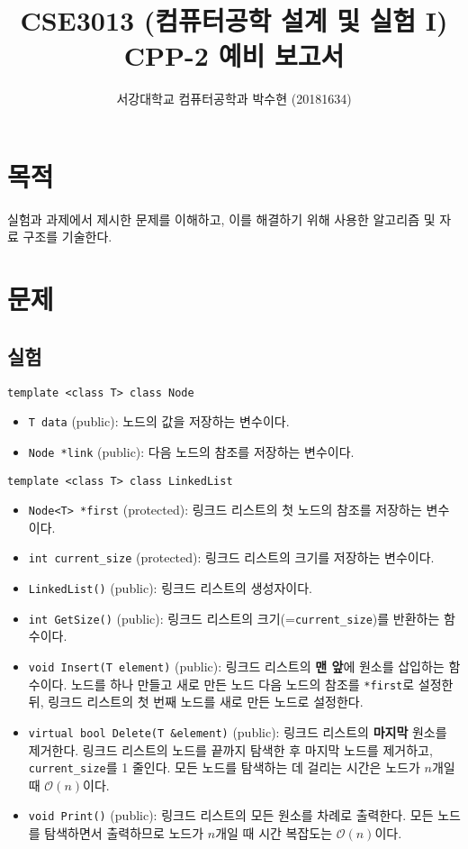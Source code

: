 
	


\title{CSE3013 (컴퓨터공학 설계 및 실험 I) \space \newline CPP-2 예비 보고서}
\author{서강대학교 컴퓨터공학과 박수현 (20181634)}
\maketitle

\section{목적}
실험과 과제에서 제시한 문제를 이해하고, 이를 해결하기 위해 사용한 알고리즘 및 자료 구조를 기술한다.

\section{문제}

\subsection{실험}

\texttt{template <class T> class Node}
\begin{itemize}
	\item \texttt{T data} (public): 노드의 값을 저장하는 변수이다.
	\item \texttt{Node *link} (public): 다음 노드의 참조를 저장하는 변수이다.
\end{itemize}

\texttt{template <class T> class LinkedList}
\begin{itemize}
	\item \texttt{Node<T> *first} (protected): 링크드 리스트의 첫 노드의 참조를 저장하는 변수이다.
	\item \texttt{int current_size} (protected): 링크드 리스트의 크기를 저장하는 변수이다.
	\item \texttt{LinkedList()} (public): 링크드 리스트의 생성자이다.
	\item \texttt{int GetSize()} (public): 링크드 리스트의 크기(=\texttt{current_size})를 반환하는 함수이다.
	\item \texttt{void Insert(T element)} (public): 링크드 리스트의 \textbf{맨 앞}에 원소를 삽입하는 함수이다.
	노드를 하나 만들고 새로 만든 노드 다음 노드의 참조를 \texttt{*first}로 설정한 뒤, 링크드 리스트의 첫 번째 노드를 새로 만든 노드로 설정한다.
	\item \texttt{virtual bool Delete(T &element)} (public): 링크드 리스트의 \textbf{마지막} 원소를 제거한다.
	링크드 리스트의 노드를 끝까지 탐색한 후 마지막 노드를 제거하고, \texttt{current_size}를 1 줄인다. 모든 노드를 탐색하는 데 걸리는 시간은
	노드가 $n$개일 때 $\mathcal{O}\left(n\right)$이다.
	\item \texttt{void Print()} (public): 링크드 리스트의 모든 원소를 차례로 출력한다. 모든 노드를 탐색하면서 출력하므로
	노드가 $n$개일 때 시간 복잡도는 $\mathcal{O}\left(n\right)$이다.
\end{itemize}

